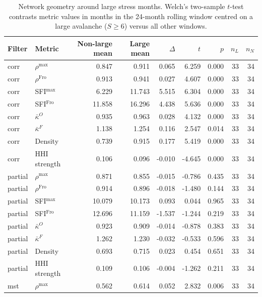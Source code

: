 \begin{table}[!htbp]
\centering
\footnotesize
\begin{threeparttable}
\caption{Network geometry around large stress months. Welch's two-sample $t$-test contrasts metric values in months in the 24-month rolling window centred on a large avalanche ($S\geq 6$) versus all other windows.}
\label{tab:network_regime}
\begin{tabular}{llrrrrrrr}
\toprule
Filter & Metric & Non-large mean & Large mean & $\Delta$ & $t$ & $p$ & $n_L$ & $n_N$ \\
\midrule
corr & $\rho^{\max}$ & 0.847 & 0.911 & 0.065 & 6.259 & 0.000 & 33 & 34 \\
corr & $\rho^{\mathrm{Fro}}$ & 0.913 & 0.941 & 0.027 & 4.607 & 0.000 & 33 & 34 \\
corr & SFI$^{\max}$ & 6.229 & 11.743 & 5.515 & 6.304 & 0.000 & 33 & 34 \\
corr & SFI$^{\mathrm{Fro}}$ & 11.858 & 16.296 & 4.438 & 5.636 & 0.000 & 33 & 34 \\
corr & $\bar{\kappa}^O$ & 0.935 & 0.963 & 0.028 & 4.132 & 0.000 & 33 & 34 \\
corr & $\bar{\kappa}^F$ & 1.138 & 1.254 & 0.116 & 2.547 & 0.014 & 33 & 34 \\
corr & Density & 0.739 & 0.915 & 0.177 & 5.419 & 0.000 & 33 & 34 \\
corr & HHI strength & 0.106 & 0.096 & -0.010 & -4.645 & 0.000 & 33 & 34 \\
partial & $\rho^{\max}$ & 0.871 & 0.855 & -0.015 & -0.786 & 0.435 & 33 & 34 \\
partial & $\rho^{\mathrm{Fro}}$ & 0.914 & 0.896 & -0.018 & -1.480 & 0.144 & 33 & 34 \\
partial & SFI$^{\max}$ & 10.079 & 10.173 & 0.093 & 0.044 & 0.965 & 33 & 34 \\
partial & SFI$^{\mathrm{Fro}}$ & 12.696 & 11.159 & -1.537 & -1.244 & 0.219 & 33 & 34 \\
partial & $\bar{\kappa}^O$ & 0.923 & 0.909 & -0.014 & -0.878 & 0.383 & 33 & 34 \\
partial & $\bar{\kappa}^F$ & 1.262 & 1.230 & -0.032 & -0.533 & 0.596 & 33 & 34 \\
partial & Density & 0.693 & 0.715 & 0.023 & 0.454 & 0.651 & 33 & 34 \\
partial & HHI strength & 0.109 & 0.106 & -0.004 & -1.262 & 0.211 & 33 & 34 \\
mst & $\rho^{\max}$ & 0.562 & 0.614 & 0.052 & 2.832 & 0.006 & 33 & 34 \\

\end{tabular}
\end{threeparttable}
\end{table}
